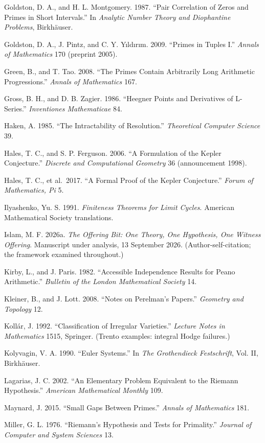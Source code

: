 \documentclass[10pt]{article}
\renewcommand{\_}{\origunderscore\allowbreak}
\begin{document}
Goldston, D. A., and H. L. Montgomery. 1987. ``Pair Correlation of Zeros
and Primes in Short Intervals.'' In \emph{Analytic Number Theory and
Diophantine Problems}, Birkhäuser.

Goldston, D. A., J. Pintz, and C. Y. Yıldırım. 2009. ``Primes in Tuples
I.'' \emph{Annals of Mathematics} 170 (preprint 2005).

Green, B., and T. Tao. 2008. ``The Primes Contain Arbitrarily Long
Arithmetic Progressions.'' \emph{Annals of Mathematics} 167.

Gross, B. H., and D. B. Zagier. 1986. ``Heegner Points and Derivatives
of L-Series.'' \emph{Inventiones Mathematicae} 84.

Haken, A. 1985. ``The Intractability of Resolution.'' \emph{Theoretical
Computer Science} 39.

Hales, T. C., and S. P. Ferguson. 2006. ``A Formulation of the Kepler
Conjecture.'' \emph{Discrete and Computational Geometry} 36
(announcement 1998).

Hales, T. C., et al.~2017. ``A Formal Proof of the Kepler Conjecture.''
\emph{Forum of Mathematics, Pi} 5.

Ilyashenko, Yu. S. 1991. \emph{Finiteness Theorems for Limit Cycles}.
American Mathematical Society translations.

Islam, M. F. 2026a. \emph{The Offering Bit: One Theory, One Hypothesis,
One Witness Offering}. Manuscript under analysis, 13 September 2026.
(Author-self-citation; the framework examined throughout.)

Kirby, L., and J. Paris. 1982. ``Accessible Independence Results for
Peano Arithmetic.'' \emph{Bulletin of the London Mathematical Society}
14.

Kleiner, B., and J. Lott. 2008. ``Notes on Perelman's Papers.''
\emph{Geometry and Topology} 12.

Kollár, J. 1992. ``Classification of Irregular Varieties.''
\emph{Lecture Notes in Mathematics} 1515, Springer. (Trento examples:
integral Hodge failures.)

Kolyvagin, V. A. 1990. ``Euler Systems.'' In \emph{The Grothendieck
Festschrift}, Vol. II, Birkhäuser.

Lagarias, J. C. 2002. ``An Elementary Problem Equivalent to the Riemann
Hypothesis.'' \emph{American Mathematical Monthly} 109.

Maynard, J. 2015. ``Small Gaps Between Primes.'' \emph{Annals of
Mathematics} 181.

Miller, G. L. 1976. ``Riemann's Hypothesis and Tests for Primality.''
\emph{Journal of Computer and System Sciences} 13.
\end{document}
